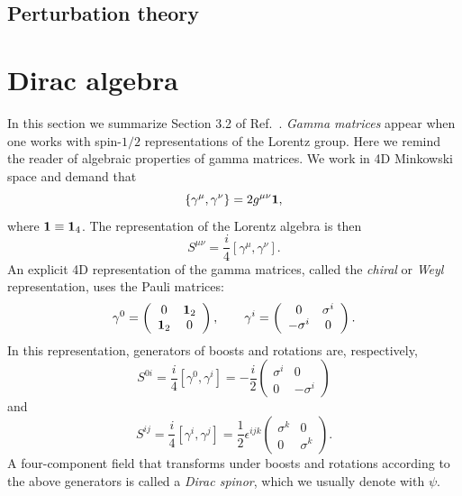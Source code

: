 \subsection{Perturbation theory}

\section{Dirac algebra}
In this section we summarize Section 3.2 of 
Ref.~\cite{peskin_introduction_1995}.
{\it Gamma matrices} appear when one works with spin-$1/2$ representations of
the Lorentz group. Here we remind the reader of algebraic properties of gamma
matrices. We work in 4D Minkowski space and demand that
\begin{equation}
  \left\{\gamma^\mu,\gamma^\nu\right\}=2g^{\mu\nu}{\mathbf 1},
\end{equation}
where ${\mathbf 1}\equiv{\mathbf 1}_4$. The representation of the Lorentz algebra is then
\begin{equation}
  S^{\mu\nu}=\frac{i}{4}\left[\gamma^\mu,\gamma^\nu\right].
\end{equation}
An explicit 4D representation of the gamma matrices, called the {\it chiral} 
or {\it Weyl} representation, uses the Pauli matrices:
\begin{equation}
  \gamma^0=\left(\begin{array}{cc}
                 0      & {\mathbf 1}_2    \\
                 {\mathbf 1}_2  & 0
           \end{array}\right), \qquad
  \gamma^i=\left(\begin{array}{cc}
                 0         & \sigma^i \\
                 -\sigma^i & 0
           \end{array}\right).
\end{equation}
In this representation, generators of boosts and rotations are, respectively,
\begin{equation}
  S^{0i}=\frac{i}{4}\left[\gamma^0,\gamma^i\right]
        =-\frac{i}{2}
         \left(\begin{array}{cc}
           \sigma^i & 0        \\
           0        & -\sigma^i
         \end{array}\right)
\end{equation}
and
\begin{equation}
  S^{ij}=\frac{i}{4}\left[\gamma^i,\gamma^j\right]
        =\frac{1}{2}\epsilon^{ijk}
         \left(\begin{array}{cc}
           \sigma^k & 0        \\
           0        & \sigma^k
         \end{array}\right).
\end{equation}
A four-component field that transforms under boosts and rotations according to
the above generators is called a {\it Dirac spinor}, which we usually denote
with $\psi$. 

